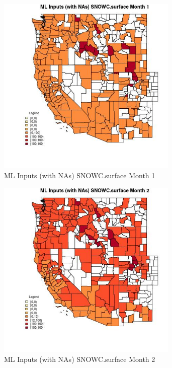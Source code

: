 \begin{figure} 
\centering  
\includegraphics[width=0.77\textwidth]{Code_Outputs/Report_ML_input_PM25_Step4_part_e_de_duplicated_aves_compiled_2019-05-21wNAs_CountySNOWCsurfacemedianMonth1.jpg} 
\caption{\label{fig:Report_ML_input_PM25_Step4_part_e_de_duplicated_aves_compiled_2019-05-21wNAsCountySNOWCsurfacemedianMonth1}ML Inputs (with NAs) SNOWC.surface Month 1} 
\end{figure} 
 

\begin{figure} 
\centering  
\includegraphics[width=0.77\textwidth]{Code_Outputs/Report_ML_input_PM25_Step4_part_e_de_duplicated_aves_compiled_2019-05-21wNAs_CountySNOWCsurfacemedianMonth2.jpg} 
\caption{\label{fig:Report_ML_input_PM25_Step4_part_e_de_duplicated_aves_compiled_2019-05-21wNAsCountySNOWCsurfacemedianMonth2}ML Inputs (with NAs) SNOWC.surface Month 2} 
\end{figure} 
 

